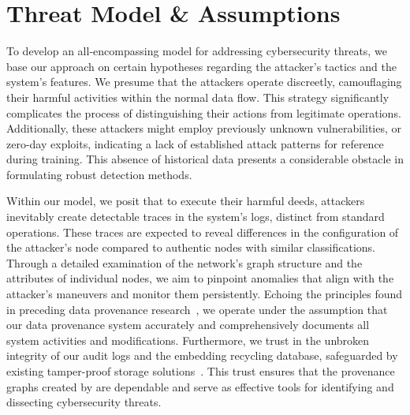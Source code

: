 
\section{Threat Model \& Assumptions}
To develop an all-encompassing model for addressing cybersecurity threats, we base our approach on certain hypotheses regarding the attacker's tactics and the system's features. We presume that the attackers operate discreetly, camouflaging their harmful activities within the normal data flow. This strategy significantly complicates the process of distinguishing their actions from legitimate operations. Additionally, these attackers might employ previously unknown vulnerabilities, or zero-day exploits, indicating a lack of established attack patterns for reference during training. This absence of historical data presents a considerable obstacle in formulating robust detection methods.

Within our model, we posit that to execute their harmful deeds, attackers inevitably create detectable traces in the system's logs, distinct from standard operations. These traces are expected to reveal differences in the configuration of the attacker's node compared to authentic nodes with similar classifications. Through a detailed examination of the network's graph structure and the attributes of individual nodes, we aim to pinpoint anomalies that align with the attacker's maneuvers and monitor them persistently. Echoing the principles found in preceding data provenance research~\cite{nodoze2019,priotracker2018,mzx2016,bates2017transparent}, we operate under the assumption that our data provenance system accurately and comprehensively documents all system activities and modifications. Furthermore, we trust in the unbroken integrity of our audit logs and the embedding recycling database, safeguarded by existing tamper-proof storage solutions~\cite{paccagnella2020custos,hardlog}. This trust ensures that the provenance graphs created by \Sys are dependable and serve as effective tools for identifying and dissecting cybersecurity threats.